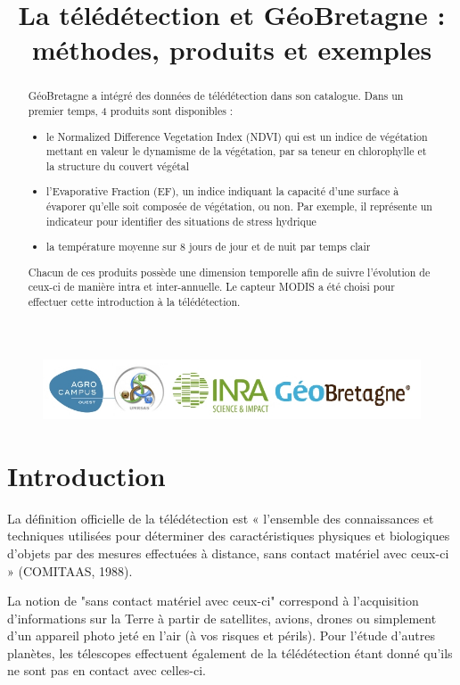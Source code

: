 \documentclass[10pt,a4paper]{article}
\title{La télédétection et GéoBretagne : méthodes, produits et exemples}
\begin{document}
\maketitle

\begin{figure}[t!]
\centering
\includegraphics[scale=1]{img/logos.jpg}
\label{logos}
\end{figure}

\begin{abstract}
GéoBretagne a intégré des données de télédétection dans son catalogue. Dans un premier temps, 4 produits sont disponibles : 
\begin{itemize}
\item le Normalized Difference Vegetation Index (NDVI) qui est un indice de végétation mettant en valeur le dynamisme de la végétation, par sa teneur en chlorophylle et la structure du couvert végétal
\item l'Evaporative Fraction (EF), un indice indiquant la capacité d'une surface à évaporer qu’elle soit composée de végétation, ou non. Par exemple, il représente un indicateur pour identifier des situations de stress hydrique
\item la température moyenne sur 8 jours de jour et de nuit par temps clair
\end{itemize}

Chacun de ces produits possède une dimension temporelle afin de suivre l'évolution de ceux-ci de manière intra et inter-annuelle. Le capteur MODIS a été choisi pour effectuer cette introduction à la télédétection.
\end{abstract}

\newpage
\tableofcontents
\newpage

\section{Introduction}

La définition officielle de la télédétection est « l’ensemble des connaissances et techniques utilisées pour déterminer des caractéristiques physiques et biologiques d’objets par des mesures effectuées à distance, sans contact matériel avec ceux-ci » (COMITAAS, 1988).\smallbreak

La notion de "sans contact matériel avec ceux-ci" correspond à l'acquisition d'informations sur la Terre à partir de satellites, avions, drones ou simplement d'un appareil photo jeté en l'air (à vos risques et périls). Pour l'étude d'autres planètes, les télescopes effectuent également de la télédétection étant donné qu'ils ne sont pas en contact avec celles-ci.\smallbreak
\end{document}
